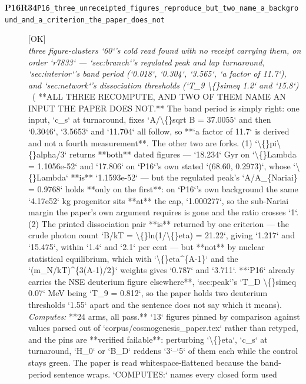 \begin{description}
\item[\textbf{P16R34}\quad\texttt{P16\_three\_unreceipted\_figures\_reproduce\_but\_two\_name\_a\_background\_and\_a\_criterion\_the\_paper\_does\_not}]\hfill\textsf{[OK]}\\
\textit{three figure-clusters `60`'s cold read found with no receipt carrying them, on order `r7833` --- `sec:branch`'s regulated peak and lap turnaround, `sec:interior`'s band period (`0.018`, `0.304`, `3.565`, `a factor of 11.7`), and `sec:network`'s dissociation thresholds (`T\_9 \textbackslash\{\}simeq 1.2` and `15.8`)} \ ( **ALL THREE RECOMPUTE, AND TWO OF THEM NAME AN INPUT THE PAPER DOES NOT.** The band period is simply right: one input, `c\_s` at turnaround, fixes `A/\textbackslash\{\}sqrt B = 37.0055` and then `0.3046`, `3.5653` and `11.704` all follow, so **`a factor of 11.7` is derived and not a fourth measurement**. The other two are forks. (1) `\textbackslash\{\}pi\textbackslash\{\}alpha/3` returns **both** dated figures --- `18.234` Gyr on `\textbackslash\{\}Lambda = 1.1056e-52` and `17.806` on `P16`'s own stated `(68.60, 0.2973)`, whose `\textbackslash\{\}Lambda` **is** `1.1593e-52` --- but the regulated peak's `A/A\_\{Nariai\} = 0.9768` holds **only on the first**: on `P16`'s own background the same `4.17e52` kg progenitor sits **at** the cap, `1.000277`, so the sub-Nariai margin the paper's own argument requires is gone and the ratio crosses `1`. (2) The printed dissociation pair **is** returned by one criterion --- the crude photon count `B/kT = \textbackslash\{\}ln(1/\textbackslash\{\}eta) = 21.22`, giving `1.217` and `15.475`, within `1.4` and `2.1` per cent --- but **not** by nuclear statistical equilibrium, which with `\textbackslash\{\}eta\textasciicircum{}\{A-1\}` and the `(m\_N/kT)\textasciicircum{}\{3(A-1)/2\}` weights gives `0.787` and `3.711`. **`P16` already carries the NSE deuterium figure elsewhere**, `sec:peak`'s `T\_D \textbackslash\{\}simeq 0.07` MeV being `T\_9 = 0.812`, so the paper holds two deuterium thresholds `1.55` apart and the sentence does not say which it means). 
\emph{Computes:} **24 arms, all pass.** `13` figures pinned by comparison against values parsed out of `corpus/cosmogenesis\_paper.tex` rather than retyped, and the pins are **verified failable**: perturbing `\textbackslash\{\}eta`, `c\_s` at turnaround, `H\_0` or `B\_D` reddens `3`--`5` of them each while the control stays green. The paper is read whitespace-flattened because the band-period sentence wraps. `COMPUTES:` names every closed form used

\end{description}
